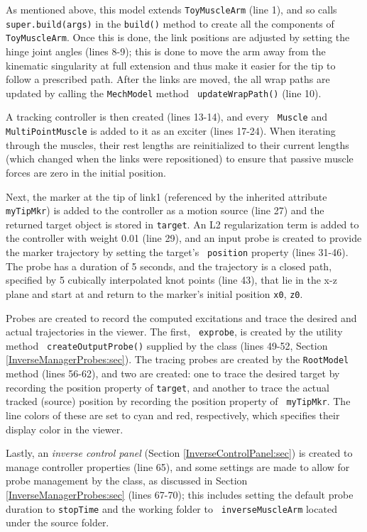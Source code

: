 As mentioned above, this model extends {\tt ToyMuscleArm} (line 1), and so
calls {\tt super.build(args)} in the {\tt build()} method to create all the
components of {\tt ToyMuscleArm}. Once this is done, the link positions are
adjusted by setting the hinge joint angles (lines 8-9); this is done to move
the arm away from the kinematic singularity at full extension and thus make it
easier for the tip to follow a prescribed path. After the links are moved, the
all wrap paths are updated by calling the {\tt MechModel} method {\tt
updateWrapPath()} (line 10).

A tracking controller is then created (lines 13-14), and every {\tt
Muscle} and {\tt MultiPointMuscle} is added to it as an exciter (lines 17-24).
When iterating through the muscles, their rest lengths are reinitialized to
their current lengths (which changed when the links were repositioned) to
ensure that passive muscle forces are zero in the initial position.

Next, the marker at the tip of link1 (referenced by the inherited attribute
{\tt myTipMkr}) is added to the controller as a motion source (line 27) and
the returned target object is stored in {\tt target}.  An L2 regularization
term is added to the controller with weight 0.01 (line 29), and an input probe
is created to provide the marker trajectory by setting the target's {\tt
position} property (lines 31-46). The probe has a duration of 5 seconds, and
the trajectory is a closed path, specified by 5 cubically interpolated knot
points (line 43), that lie in the x-z plane and start at and return to the
marker's initial position {\tt x0}, {\tt z0}.

Probes are created to record the computed excitations and trace the
desired and actual trajectories in the viewer. The first, {\tt
exprobe}, is created by the utility method {\tt
createOutputProbe()} supplied by the
 class 
(lines 49-52, Section \ref{InverseManagerProbes:sec}). The tracing probes
are created by the {\tt RootModel} method
 (lines
56-62), and two are created: one to trace the desired target by recording the
{\sf position} property of {\tt target}, and another to trace the actual
tracked (source) position by recording the {\sf position} property of {\tt
myTipMkr}. The line colors of these are set to cyan and red, respectively,
which specifies their display color in the viewer.

Lastly, an {\it inverse control panel} (Section \ref{InverseControlPanel:sec})
is created to manage controller properties (line 65), and some settings are
made to allow for probe management by the 
 class, as discussed
in Section \ref{InverseManagerProbes:sec} (lines 67-70); this includes setting
the default probe duration to {\tt stopTime} and the working folder to {\tt
inverseMuscleArm} located under the source folder.

